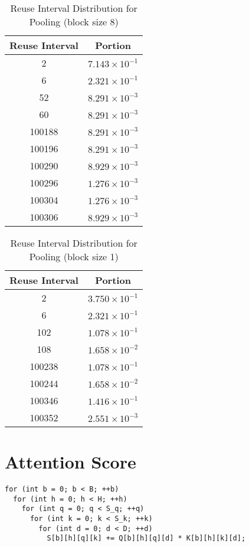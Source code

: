 \documentclass[conference]{article}
\begin{document}
\begin{table}[H]
\centering
\begin{tabular}{|c|c|}
    \hline
    Reuse Interval & Portion \\ 
    \hline
    2 & $7.143 \times 10^{-1}$ \\ 
    6 & $2.321 \times 10^{-1}$ \\ 
    52 & $8.291 \times 10^{-3}$ \\ 
    60 & $8.291 \times 10^{-3}$ \\ 
    100188 & $8.291 \times 10^{-3}$ \\ 
    100196 & $8.291 \times 10^{-3}$ \\ 
    100290 & $8.929 \times 10^{-3}$ \\ 
    100296 & $1.276 \times 10^{-3}$ \\ 
    100304 & $1.276 \times 10^{-3}$ \\ 
    100306 & $8.929 \times 10^{-3}$ \\ 
    \hline
\end{tabular}
\caption{Reuse Interval Distribution for Pooling (block size 8)}
\end{table}

\begin{table}[H]
\centering
\begin{tabular}{|c|c|}
    \hline
    Reuse Interval & Portion \\ 
    \hline
    2 & $3.750 \times 10^{-1}$ \\ 
    6 & $2.321 \times 10^{-1}$ \\ 
    102 & $1.078 \times 10^{-1}$ \\ 
    108 & $1.658 \times 10^{-2}$ \\ 
    100238 & $1.078 \times 10^{-1}$ \\ 
    100244 & $1.658 \times 10^{-2}$ \\ 
    100346 & $1.416 \times 10^{-1}$ \\ 
    100352 & $2.551 \times 10^{-3}$ \\ 
    \hline
\end{tabular}
\caption{Reuse Interval Distribution for Pooling (block size 1)}
\end{table}

\section{Attention Score}
\begin{verbatim}
for (int b = 0; b < B; ++b)
  for (int h = 0; h < H; ++h)
    for (int q = 0; q < S_q; ++q)
      for (int k = 0; k < S_k; ++k)
        for (int d = 0; d < D; ++d)
          S[b][h][q][k] += Q[b][h][q][d] * K[b][h][k][d];  
\end{verbatim}
\end{document}
